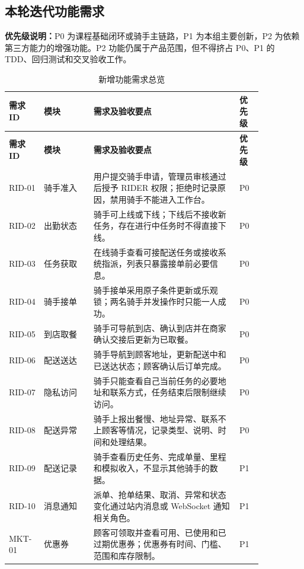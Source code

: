 \begingroup
\color{red}

\subsection{本轮迭代功能需求}

\textbf{优先级说明：}P0 为课程基础闭环或骑手主链路，P1 为本组主要创新，P2 为依赖第三方能力的增强功能。P2 功能仍属于产品范围，但不得挤占 P0、P1 的 TDD、回归测试和交叉验收工作。

\begin{longtable}{@{}p{0.10\linewidth}p{0.17\linewidth}p{0.50\linewidth}p{0.08\linewidth}@{}}
\caption{新增功能需求总览}\tabularnewline
\toprule
\textbf{需求 ID} & \textbf{模块} & \textbf{需求及验收要点} & \textbf{优先级} \\
\midrule
\endfirsthead
\toprule
\textbf{需求 ID} & \textbf{模块} & \textbf{需求及验收要点} & \textbf{优先级} \\
\midrule
\endhead
\bottomrule
\endfoot
RID-01 & 骑手准入 & 用户提交骑手申请，管理员审核通过后授予 RIDER 权限；拒绝时记录原因，禁用骑手不能进入工作台。 & P0 \\
RID-02 & 出勤状态 & 骑手可上线或下线；下线后不接收新任务，存在进行中任务时不得直接下线。 & P0 \\
RID-03 & 任务获取 & 在线骑手查看可接配送任务或接收系统指派，列表只暴露接单前必要信息。 & P0 \\
RID-04 & 骑手接单 & 骑手接单采用原子条件更新或乐观锁；两名骑手并发操作时只能一人成功。 & P0 \\
RID-05 & 到店取餐 & 骑手可导航到店、确认到店并在商家确认交接后更新为已取餐。 & P0 \\
RID-06 & 配送送达 & 骑手导航到顾客地址，更新配送中和已送达状态；顾客确认后订单完成。 & P0 \\
RID-07 & 隐私访问 & 骑手只能查看自己当前任务的必要地址和联系方式，任务结束后限制继续访问。 & P0 \\
RID-08 & 配送异常 & 骑手上报出餐慢、地址异常、联系不上顾客等情况，记录类型、说明、时间和处理结果。 & P0 \\
RID-09 & 配送记录 & 骑手查看历史任务、完成单量、里程和模拟收入，不显示其他骑手的数据。 & P1 \\
RID-10 & 消息通知 & 派单、抢单结果、取消、异常和状态变化通过站内消息或 WebSocket 通知相关角色。 & P1 \\
MKT-01 & 优惠券 & 顾客可领取并查看可用、已使用和已过期优惠券；优惠券有时间、门槛、范围和库存限制。 & P1 \\

\end{longtable}
